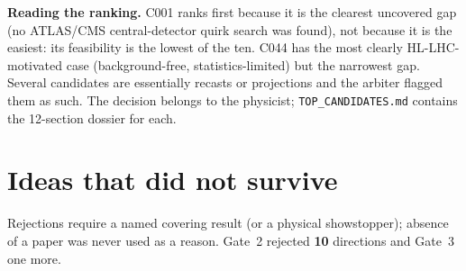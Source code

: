 \documentclass[11pt,a4paper]{article}
\begin{document}
\begin{key}\textbf{Reading the ranking.} C001 ranks first because it is the clearest uncovered gap (no ATLAS/CMS central-detector quirk search was found), not because it is the easiest: its feasibility is the lowest of the ten. C044 has the most clearly HL-LHC-motivated case (background-free, statistics-limited) but the narrowest gap. Several candidates are essentially recasts or projections and the arbiter flagged them as such. The decision belongs to the physicist; \texttt{TOP\_CANDIDATES.md} contains the 12-section dossier for each.\end{key}

\section{Ideas that did not survive}
Rejections require a named covering result (or a physical showstopper); absence of a paper was never used as a reason. Gate~2 rejected \textbf{10} directions and Gate~3 one more.
\end{document}
